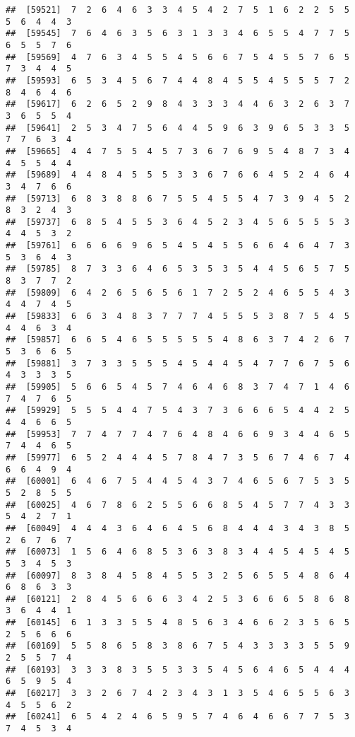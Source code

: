 \documentclass[
]{book}
\begin{document}
\begin{verbatim}
##  [59521]  7  2  6  4  6  3  3  4  5  4  2  7  5  1  6  2  2  5  5  5  6  4  4  3
##  [59545]  7  6  4  6  3  5  6  3  1  3  3  4  6  5  5  4  7  7  5  6  5  5  7  6
##  [59569]  4  7  6  3  4  5  5  4  5  6  6  7  5  4  5  5  7  6  5  7  3  4  4  5
##  [59593]  6  5  3  4  5  6  7  4  4  8  4  5  5  4  5  5  5  7  2  8  4  6  4  6
##  [59617]  6  2  6  5  2  9  8  4  3  3  3  4  4  6  3  2  6  3  7  3  6  5  5  4
##  [59641]  2  5  3  4  7  5  6  4  4  5  9  6  3  9  6  5  3  3  5  7  7  6  3  4
##  [59665]  4  4  7  5  5  4  5  7  3  6  7  6  9  5  4  8  7  3  4  4  5  5  4  4
##  [59689]  4  4  8  4  5  5  5  3  3  6  7  6  6  4  5  2  4  6  4  3  4  7  6  6
##  [59713]  6  8  3  8  8  6  7  5  5  4  5  5  4  7  3  9  4  5  2  8  3  2  4  3
##  [59737]  6  8  5  4  5  5  3  6  4  5  2  3  4  5  6  5  5  5  3  4  4  5  3  2
##  [59761]  6  6  6  6  9  6  5  4  5  4  5  5  6  6  4  6  4  7  3  5  3  6  4  3
##  [59785]  8  7  3  3  6  4  6  5  3  5  3  5  4  4  5  6  5  7  5  8  3  7  7  2
##  [59809]  6  4  2  6  5  6  5  6  1  7  2  5  2  4  6  5  5  4  3  4  4  7  4  5
##  [59833]  6  6  3  4  8  3  7  7  7  4  5  5  5  3  8  7  5  4  5  4  4  6  3  4
##  [59857]  6  6  5  4  6  5  5  5  5  5  4  8  6  3  7  4  2  6  7  5  3  6  6  5
##  [59881]  3  7  3  3  5  5  5  4  5  4  4  5  4  7  7  6  7  5  6  4  3  3  3  5
##  [59905]  5  6  6  5  4  5  7  4  6  4  6  8  3  7  4  7  1  4  6  7  4  7  6  5
##  [59929]  5  5  5  4  4  7  5  4  3  7  3  6  6  6  5  4  4  2  5  4  4  6  6  5
##  [59953]  7  7  4  7  7  4  7  6  4  8  4  6  6  9  3  4  4  6  5  7  4  4  6  5
##  [59977]  6  5  2  4  4  4  5  7  8  4  7  3  5  6  7  4  6  7  4  6  6  4  9  4
##  [60001]  6  4  6  7  5  4  4  5  4  3  7  4  6  5  6  7  5  3  5  5  2  8  5  5
##  [60025]  4  6  7  8  6  2  5  5  6  6  8  5  4  5  7  7  4  3  3  5  4  2  7  1
##  [60049]  4  4  4  3  6  4  6  4  5  6  8  4  4  4  3  4  3  8  5  2  6  7  6  7
##  [60073]  1  5  6  4  6  8  5  3  6  3  8  3  4  4  5  4  5  4  5  5  3  4  5  3
##  [60097]  8  3  8  4  5  8  4  5  5  3  2  5  6  5  5  4  8  6  4  6  8  6  3  3
##  [60121]  2  8  4  5  6  6  6  3  4  2  5  3  6  6  6  5  8  6  8  3  6  4  4  1
##  [60145]  6  1  3  3  5  5  4  8  5  6  3  4  6  6  2  3  5  6  5  2  5  6  6  6
##  [60169]  5  5  8  6  5  8  3  8  6  7  5  4  3  3  3  3  5  5  9  2  5  5  7  4
##  [60193]  3  3  3  8  3  5  5  3  3  5  4  5  6  4  6  5  4  4  4  6  5  9  5  4
##  [60217]  3  3  2  6  7  4  2  3  4  3  1  3  5  4  6  5  5  6  3  4  5  5  6  2
##  [60241]  6  5  4  2  4  6  5  9  5  7  4  6  4  6  6  7  7  5  3  7  4  5  3  4

\end{verbatim}
\end{document}
